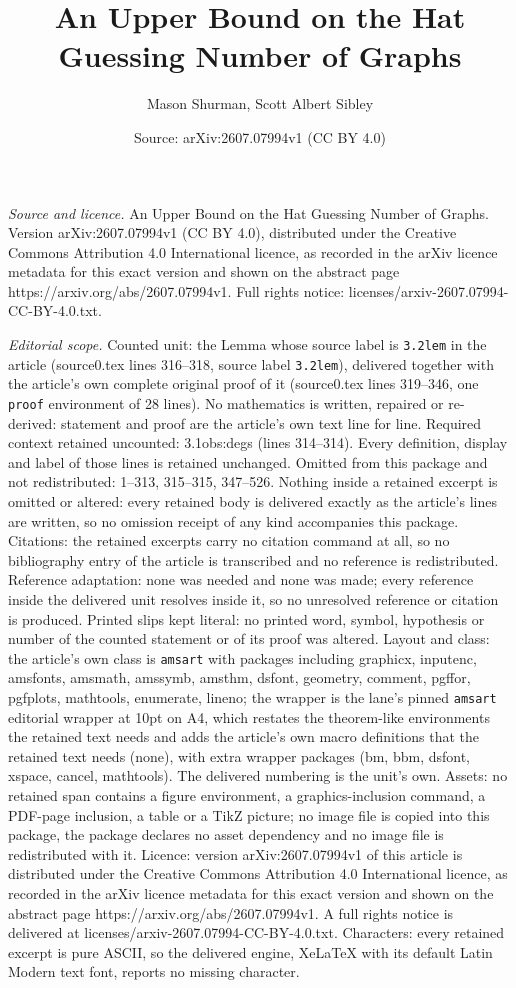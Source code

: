 \documentclass[10pt,a4paper]{amsart}
\title[An Upper Bound on the Hat Guessing Number of Graphs]{An Upper Bound on the Hat Guessing Number of Graphs}
\author{Mason Shurman, Scott Albert Sibley}
\date{Source: arXiv:2607.07994v1 (CC BY 4.0)}
\begin{document}
\maketitle

\noindent\emph{Source and licence.} An Upper Bound on the Hat Guessing Number of Graphs. Version arXiv:2607.07994v1 (CC BY 4.0), distributed under the Creative Commons Attribution 4.0 International licence, as recorded in the arXiv licence metadata for this exact version and shown on the abstract page https://arxiv.org/abs/2607.07994v1. Full rights notice: licenses/arxiv-2607.07994-CC-BY-4.0.txt.\par\smallskip

\noindent\textit{Editorial scope.} Counted unit: the Lemma whose source label is \texttt{3.2lem} in the article (source0.tex lines 316--318, source label \texttt{3.2lem}), delivered together with the article's own complete original proof of it (source0.tex lines 319--346, one \texttt{proof} environment of 28 lines). No mathematics is written, repaired or re-derived: statement and proof are the article's own text line for line. Required context retained uncounted: 3.1obs:degs (lines 314--314). Every definition, display and label of those lines is retained unchanged. Omitted from this package and not redistributed: 1--313, 315--315, 347--526. Nothing inside a retained excerpt is omitted or altered: every retained body is delivered exactly as the article's lines are written, so no omission receipt of any kind accompanies this package. Citations: the retained excerpts carry no citation command at all, so no bibliography entry of the article is transcribed and no reference is redistributed. Reference adaptation: none was needed and none was made; every reference inside the delivered unit resolves inside it, so no unresolved reference or citation is produced. Printed slips kept literal: no printed word, symbol, hypothesis or number of the counted statement or of its proof was altered. Layout and class: the article's own class is \texttt{amsart} with packages including graphicx, inputenc, amsfonts, amsmath, amssymb, amsthm, dsfont, geometry, comment, pgffor, pgfplots, mathtools, enumerate, lineno; the wrapper is the lane's pinned \texttt{amsart} editorial wrapper at 10pt on A4, which restates the theorem-like environments the retained text needs and adds the article's own macro definitions that the retained text needs (none), with extra wrapper packages (bm, bbm, dsfont, xspace, cancel, mathtools). The delivered numbering is the unit's own. Assets: no retained span contains a figure environment, a graphics-inclusion command, a PDF-page inclusion, a table or a TikZ picture; no image file is copied into this package, the package declares no asset dependency and no image file is redistributed with it. Licence: version arXiv:2607.07994v1 of this article is distributed under the Creative Commons Attribution 4.0 International licence, as recorded in the arXiv licence metadata for this exact version and shown on the abstract page https://arxiv.org/abs/2607.07994v1. A full rights notice is delivered at licenses/arxiv-2607.07994-CC-BY-4.0.txt. Characters: every retained excerpt is pure ASCII, so the delivered engine, XeLaTeX with its default Latin Modern text font, reports no missing character.
\end{document}
